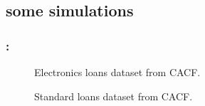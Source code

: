 \documentclass[english,xcolor={rgb,dvipsnames,table,usenames}]{beamer}
\newcommand{\f}{\text{f}}
\begin{document}
\subsection{some simulations}

\begin{frame}
\frametitle{\secname : \subsecname}

\begin{figure}[!ht]
\centering \resizebox{.8\textwidth}{!}{}
\caption{Electronics loans dataset from CACF.}
\label{fig:darty_reject}
\end{figure}
\vspace*{-1cm}
\begin{figure}[!ht]
\centering \resizebox{.8\textwidth}{!}{}
\caption{Standard loans dataset from CACF.}
\label{fig:M3_reject}
\end{figure}

\end{frame}





%
%
\end{document}
